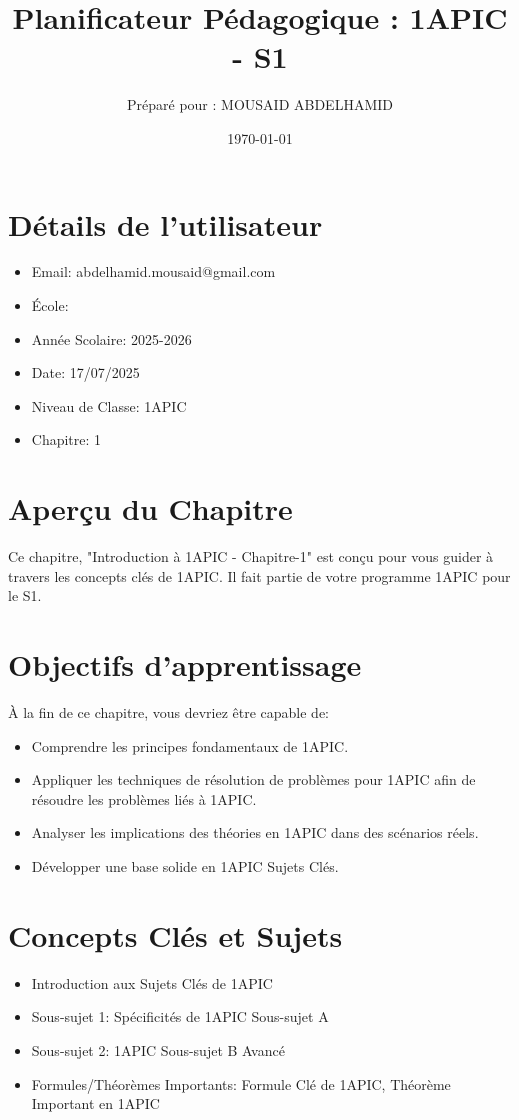 \documentclass{article}
\title{Planificateur Pédagogique : 1APIC - S1}
\author{Préparé pour : MOUSAID ABDELHAMID}
\date{\today}
\begin{document}
\maketitle

\section*{Détails de l'utilisateur}
\begin{itemize}
    \item Email: abdelhamid.mousaid@gmail.com
    \item École: 
    \item Année Scolaire: 2025-2026
    \item Date: 17/07/2025
    \item Niveau de Classe: 1APIC
    \item Chapitre: 1
\end{itemize}

\section*{Aperçu du Chapitre}
Ce chapitre, "Introduction à 1APIC - Chapitre-1" est conçu pour vous guider à travers les concepts clés de 1APIC. Il fait partie de votre programme 1APIC pour le S1.

\section*{Objectifs d'apprentissage}
À la fin de ce chapitre, vous devriez être capable de:
\begin{itemize}
    \item Comprendre les principes fondamentaux de 1APIC.
    \item Appliquer les techniques de résolution de problèmes pour 1APIC afin de résoudre les problèmes liés à 1APIC.
    \item Analyser les implications des théories en 1APIC dans des scénarios réels.
    \item Développer une base solide en 1APIC Sujets Clés.
\end{itemize}

\section*{Concepts Clés et Sujets}
\begin{itemize}
    \item Introduction aux Sujets Clés de 1APIC
    \item Sous-sujet 1: Spécificités de 1APIC Sous-sujet A
    \item Sous-sujet 2: 1APIC Sous-sujet B Avancé
    \item Formules/Théorèmes Importants: Formule Clé de 1APIC, Théorème Important en 1APIC
\end{itemize}
\end{document}
